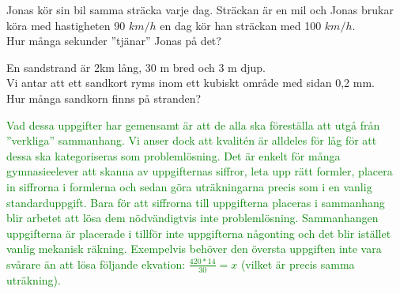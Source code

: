 
\begin{displayquote}
\textcolor{turkos}{Jonas kör sin bil samma sträcka varje dag. Sträckan är en mil och Jonas brukar köra med hastigheten 90 $km/h$ en dag kör han sträckan med 100 $km/h$. \\
Hur många sekunder ''tjänar'' Jonas på det?}
\end{displayquote}





\begin{displayquote}
\textcolor{turkos}{En sandstrand är 2km lång, 30 m bred och 3 m djup. \\
Vi antar att ett sandkort ryms inom ett kubiskt område med sidan 0,2 mm.\\
Hur många sandkorn finns på stranden?}
\end{displayquote}

\noindent \textcolor{green}{Vad dessa uppgifter har gemensamt är att de alla ska föreställa att utgå från ''verkliga'' sammanhang. Vi anser dock att kvalitén är alldeles för låg för att dessa ska kategoriseras som problemlösning. Det är enkelt för många gymnasieelever att skanna av uppgifternas siffror, leta upp rätt formler, placera in siffrorna i formlerna och sedan göra uträkningarna precis som i en vanlig standarduppgift. Bara för att siffrorna till uppgifterna placeras i sammanhang blir arbetet att lösa dem nödvändigtvis inte problemlösning. Sammanhangen uppgifterna är placerade i tillför inte uppgifterna någonting och det blir istället vanlig mekanisk räkning. Exempelvis behöver den översta uppgiften inte vara svårare än att lösa följande ekvation: $\frac{420*14}{30} = x$ (vilket är precis samma uträkning).}



